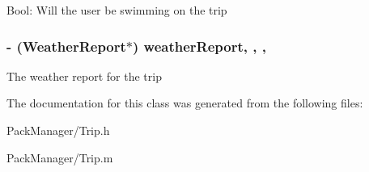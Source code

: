 Bool\-: Will the user be swimming on the trip \hypertarget{interface_trip_a50df03c3a57389928c170792a63aa67f}{
\subsubsection[{weather\-Report}]{\setlength{\rightskip}{0pt plus 5cm}-\/ ({\bf Weather\-Report}$\ast$) weather\-Report\hspace{0.3cm}{\ttfamily [read]}, {\ttfamily [write]}, {\ttfamily [nonatomic]}, {\ttfamily [strong]}}}\label{interface_trip_a50df03c3a57389928c170792a63aa67f}
The weather report for the trip 

The documentation for this class was generated from the following files\-:\begin{DoxyCompactItemize}
\item 
Pack\-Manager/Trip.\-h\item 
Pack\-Manager/Trip.\-m\end{DoxyCompactItemize}
